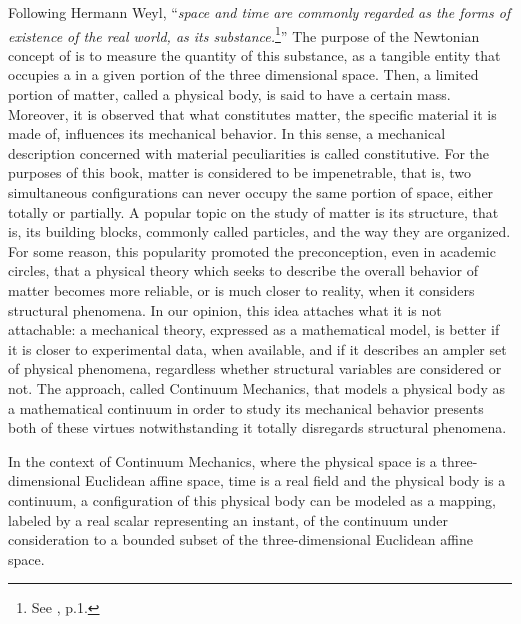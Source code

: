 Following Hermann Weyl, ``\emph{space and time are commonly regarded as the forms of existence of the real world,  as its substance.}\footnote{See \cite{weyl_1952_2}, p.1.}'' The purpose of the Newtonian concept of  is to measure the quantity of this substance, as a tangible entity that occupies a  in a given portion of the three dimensional space. Then, a limited portion of matter, called a physical body, is said to have a certain mass. Moreover, it is observed that what constitutes matter, the specific material it is made of, influences its mechanical behavior. In this sense, a mechanical description concerned with material peculiarities is called constitutive. For the purposes of this book, matter is considered to be impenetrable, that is, two simultaneous configurations can never occupy the same portion of space, either totally or partially. A popular topic on the study of matter is its structure, that is, its building blocks, commonly called particles, and the way they are organized. For some reason, this popularity promoted the preconception, even in academic circles, that a physical theory which seeks to describe the overall behavior of matter becomes more reliable, or is much closer to reality, when it considers structural phenomena. In our opinion, this idea attaches what it is not attachable: a mechanical theory, expressed as a mathematical model, is better if it is closer to experimental data, when available, and if it describes an ampler set of physical phenomena, regardless whether structural variables are considered or not. The approach, called Continuum Mechanics, that models a physical body as a mathematical continuum in order to study its mechanical behavior presents both of these virtues notwithstanding it totally disregards structural phenomena. 

In the context of Continuum Mechanics, where the physical space is a three-dimensional Euclidean affine space, time is a real field and the physical body is a continuum, a configuration of this physical body can be modeled as a mapping, labeled by a real scalar representing an instant, of the continuum under consideration to a bounded subset of the three-dimensional Euclidean affine space. 










